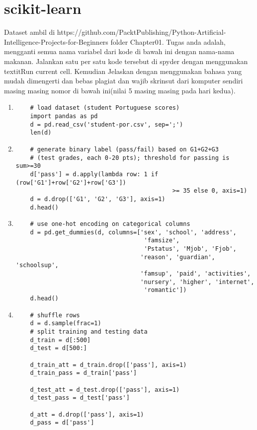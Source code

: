 \section{scikit-learn}
Dataset ambil di https://github.com/PacktPublishing/Python-Artificial-Intelligence-Projects-for-Beginners folder Chapter01.
Tugas anda adalah, mengganti semua nama variabel dari kode di bawah ini dengan nama-nama makanan. Jalankan satu per satu kode tersebut di spyder dengan menggunakan textit{Run current cell}. Kemudian Jelaskan dengan menggunakan bahasa yang mudah dimengerti dan bebas plagiat dan wajib skrinsut dari komputer sendiri masing masing nomor di bawah ini(nilai 5 masing masing pada hari kedua).

\begin{enumerate}

\item
\begin{verbatim}
	# load dataset (student Portuguese scores)
	import pandas as pd
	d = pd.read_csv('student-por.csv', sep=';')
	len(d)
\end{verbatim}
\item
\begin{verbatim}
	# generate binary label (pass/fail) based on G1+G2+G3 
	# (test grades, each 0-20 pts); threshold for passing is sum>=30
	d['pass'] = d.apply(lambda row: 1 if (row['G1']+row['G2']+row['G3']) 
											>= 35 else 0, axis=1)
	d = d.drop(['G1', 'G2', 'G3'], axis=1)
	d.head()
\end{verbatim}
\item
\begin{verbatim}
	# use one-hot encoding on categorical columns
	d = pd.get_dummies(d, columns=['sex', 'school', 'address', 
									'famsize', 
									'Pstatus', 'Mjob', 'Fjob', 
	                               'reason', 'guardian', 'schoolsup', 
								   'famsup', 'paid', 'activities',
	                               'nursery', 'higher', 'internet', 
									'romantic'])
	d.head()
\end{verbatim}
\item
\begin{verbatim}
	# shuffle rows
	d = d.sample(frac=1)
	# split training and testing data
	d_train = d[:500]
	d_test = d[500:]

	d_train_att = d_train.drop(['pass'], axis=1)
	d_train_pass = d_train['pass']

	d_test_att = d_test.drop(['pass'], axis=1)
	d_test_pass = d_test['pass']

	d_att = d.drop(['pass'], axis=1)
	d_pass = d['pass']


\end{verbatim}
\end{enumerate}
